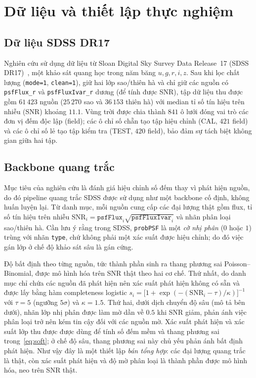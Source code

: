 \documentclass[pdflatex,sn-mathphys-num]{sn-jnl}
\begin{document}
\section{Dữ liệu và thiết lập thực nghiệm}\label{sec:data}

\subsection{Dữ liệu SDSS DR17}
Nghiên cứu sử dụng dữ liệu từ Sloan Digital Sky Survey Data Release~17 (SDSS
DR17)~\cite{sdss_dr17,sdss_technical}, một khảo sát quang học trong năm băng $u,g,r,i,z$. Sau khi lọc chất
lượng (\texttt{mode=1}, \texttt{clean=1}), giữ hai lớp sao/thiên hà và chỉ giữ các nguồn có
\texttt{psfFlux\_r} và \texttt{psfFluxIvar\_r} dương (để tính được SNR), tập dữ liệu thu được gồm $61\,423$
nguồn ($25\,270$ sao và $36\,153$ thiên hà) với median tỉ số tín hiệu trên nhiễu (SNR) khoảng $11.1$. Vùng trời được chia thành $841$ ô lưới đóng vai
trò các đơn vị đếm độc lập (field); các ô chỉ số chẵn tạo tập hiệu chỉnh (CAL, $421$ field) và các ô chỉ số
lẻ tạo tập kiểm tra (TEST, $420$ field), bảo đảm sự tách biệt không gian giữa hai tập.

\subsection{Backbone quang trắc}
Mục tiêu của nghiên cứu là đánh giá hiệu chỉnh số đếm thay vì phát hiện nguồn, do đó pipeline quang trắc SDSS
được sử dụng như một backbone cố định, không huấn luyện lại. Từ danh mục, mỗi nguồn cung cấp các đại lượng
thật gồm flux, tỉ số tín hiệu trên nhiễu $\mathrm{SNR}_i=\texttt{psfFlux}_i\sqrt{\texttt{psfFluxIvar}_i}$ và
nhãn phân loại sao/thiên hà. Cần lưu ý rằng trong SDSS, \texttt{probPSF} là một \emph{cờ nhị phân} ($0$ hoặc
$1$) trùng với nhãn \texttt{type}, chứ không phải một xác suất được hiệu chỉnh; do đó việc gán lớp ở chế độ
khảo sát sâu là gán cứng.

Độ bất định theo từng nguồn, tức thành phần sinh ra thang phương sai Poisson--Binomial, được mô hình hóa trên
SNR thật theo hai cơ chế. Thứ nhất, do danh mục chỉ chứa các nguồn đã phát hiện nên xác suất phát hiện không
có sẵn và được lấy bằng hàm completeness logistic $s_i=\big[1+\exp(-(\mathrm{SNR}_i-\tau)/\kappa)\big]^{-1}$
với $\tau=5$ (ngưỡng $5\sigma$) và $\kappa=1.5$. Thứ hai, dưới dịch chuyển độ sâu (mô tả bên dưới), nhãn lớp
nhị phân được làm mờ dần về $0.5$ khi SNR giảm, phản ánh việc phân loại trở nên kém tin cậy đối với các nguồn
mờ. Xác suất phát hiện và xác suất lớp thu được được dùng để tính số đếm mềm và thang phương sai
trong~\eqref{eq:soft}; ở chế độ sâu, thang phương sai này chủ yếu phản ánh bất định phát hiện. Như vậy đây là
một thiết lập \emph{bán tổng hợp}: các đại lượng quang trắc là thật, còn xác suất phát hiện và độ mờ phân
loại là thành phần được mô hình hóa, neo trên SNR thật.
\end{document}
